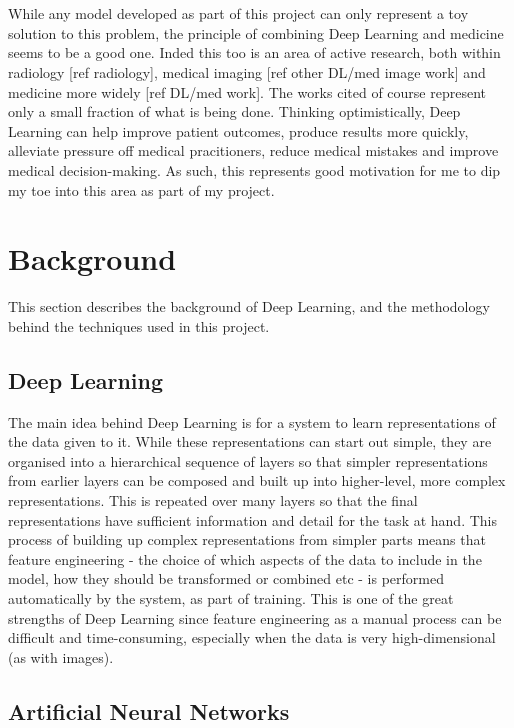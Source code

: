 \documentclass[11pt]{article} %
\theoremstyle{plain}
\theoremstyle{definition}
\begin{document}
\\
\\
\noindent
While any model developed as part of this project can only represent a toy solution to this problem, the principle of combining Deep Learning and medicine seems to be a good one. Inded this too is an area of active research, both within radiology [ref radiology], medical imaging [ref other DL/med image work] and medicine more widely [ref DL/med work]. The works cited of course represent only a small fraction of what is being done. Thinking optimistically, Deep Learning can help improve patient outcomes, produce results more quickly, alleviate pressure off medical pracitioners, reduce medical mistakes and improve medical decision-making. As such, this represents good motivation for me to dip my toe into this area as part of my project.



\newpage
\section{Background}
This section describes the background of Deep Learning, and the methodology behind the techniques used in this project.

\subsection{Deep Learning}
The main idea behind Deep Learning is for a system to learn representations of the data given to it. While these representations can start out simple, they are organised into a hierarchical sequence of layers so that simpler representations from earlier layers can be composed and built up into higher-level, more complex representations. This is repeated over many layers so that the final representations have sufficient information and detail for the task at hand. This process of building up complex representations from simpler parts means that feature engineering - the choice of which aspects of the data to include in the model, how they should be transformed or combined etc - is performed automatically by the system, as part of training. This is one of the great strengths of Deep Learning since feature engineering as a manual process can be difficult and time-consuming, especially when the data is very high-dimensional (as with images).       

\subsection{Artificial Neural Networks}
\end{document}
